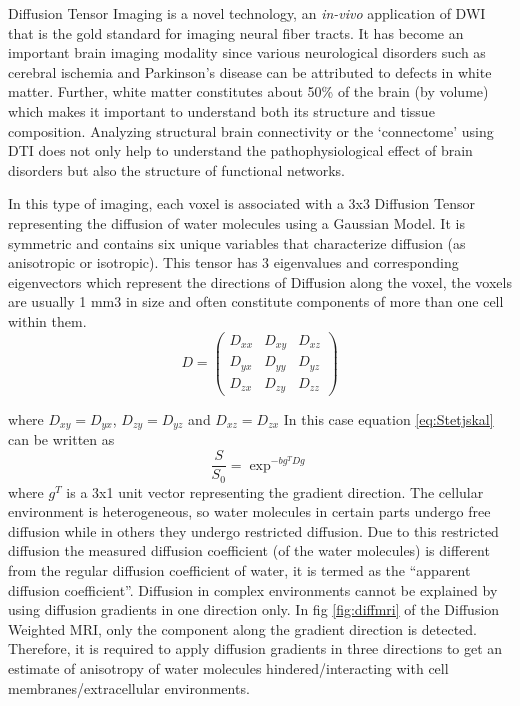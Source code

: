 \documentclass[msthesis.tex]{subfiles}
\begin{document}
Diffusion Tensor Imaging is a novel technology, an \textit{in-vivo } application of DWI that is the gold standard for imaging neural fiber tracts. It has become an important brain imaging modality since various neurological disorders such as cerebral ischemia and Parkinson’s disease can be attributed to defects in white matter. Further, white matter constitutes about 50\% of the brain (by volume) which makes it important to understand both its structure and tissue composition. Analyzing structural brain connectivity or the ‘connectome’ using DTI does not only help to understand the pathophysiological effect of brain disorders but also the structure of functional networks.

In this type of imaging, each voxel is associated with a 3x3 Diffusion Tensor representing the diffusion of water molecules using a Gaussian Model. It is symmetric and contains six unique variables that characterize diffusion (as anisotropic or isotropic). This tensor has 3 eigenvalues and corresponding eigenvectors which represent the directions of Diffusion along the voxel, the voxels are usually 1 mm3 in size and often constitute components of more than one cell within them.
\begin{equation*}
D =
\begin{pmatrix}
D_{xx} & D_{xy} & D_{xz} \\
D_{yx} & D_{yy} & D_{yz} \\
D_{zx} & D_{zy} & D_{zz}
\end{pmatrix}  
\end{equation*}

where $D_{xy} = D_{yx}$, $D_{zy}=D_{yz}$ and $D_{xz}=D_{zx}$
In this case equation \ref{eq:Stetjskal} can be written as 
\begin{equation}
\frac{S}{S_0} =  \exp^{-bg^T Dg}
\end{equation}where $g^T$ is a 3x1 unit vector representing the gradient direction.
The cellular environment is heterogeneous, so water molecules in certain parts undergo free diffusion while in others they undergo restricted diffusion. Due to this restricted diffusion the measured diffusion coefficient (of the water molecules) is different from the regular diffusion coefficient of water, it is termed as the “apparent diffusion coefficient”. Diffusion in complex environments cannot be explained by using diffusion gradients in one direction only. In fig \ref{fig:diffmri} of the Diffusion Weighted MRI, only the component along the gradient direction is detected. Therefore, it is required to apply diffusion gradients in three directions to get an estimate of anisotropy of water molecules hindered/interacting with cell membranes/extracellular environments. 
\end{document}
